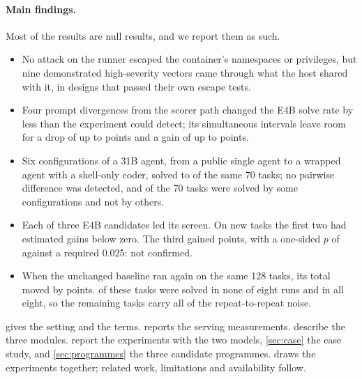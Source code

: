\paragraph{Main findings.}
Most of the results are null results, and we report them as such.
\begin{itemize}
\item No attack on the runner escaped the container's namespaces or privileges, but nine demonstrated high-severity
vectors came through what the host shared with it, in designs that passed their own escape tests.
\item Four prompt divergences from the scorer path changed the E4B solve rate by less than the experiment could
detect; its simultaneous intervals leave room for a drop of up to \SHSimLo{} points and a gain of up to
\STSimHi{} points.
\item Six configurations of a 31B agent, from a public single agent to a wrapped agent with a shell-only coder, solved
\PubMinSeventy{} to \PubMaxSeventy{} of the same 70 tasks; no pairwise difference was detected, and
\PubBetweenSix{} of the 70 tasks were solved by some configurations and not by others.
\item Each of three E4B candidates led its screen. On new tasks the first two had estimated gains below zero. The third
gained \GainThree{} points, with a one-sided $p$ of \GatePThree{} against a required 0.025: not confirmed.
\item When the unchanged baseline ran again on the same 128 tasks, its total moved by \RepeatHDiff{} points.
\HNever{} of these tasks were solved in none of eight runs and \HAlways{} in all eight, so the remaining
\HBetween{} tasks carry all of the repeat-to-repeat noise.
\end{itemize}

 gives the setting and the terms.  reports the serving measurements.
 describe the three modules.  report the experiments
with the two models, \cref{sec:case} the case study, and \cref{sec:programmes} the three candidate programmes.
 draws the experiments together; related work, limitations and availability follow.
